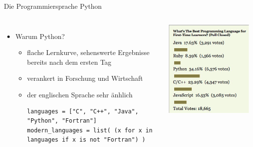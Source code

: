\begin{frame}[fragile]{Die Programmiersprache Python}
\begin{columns}
    \begin{itemize}
        \item Warum Python?
            \begin{itemize}
                \item flache Lernkurve, sehenswerte Ergebnisse bereits nach dem ersten Tag
                \item verankert in Forschung und Wirtschaft
                \item der englischen Sprache sehr änhlich
                \newline
                \newline
                \newline
                \newline
                \newline
\begin{lstlisting}[basicstyle=\tiny, frame=none]
languages = ["C", "C++", "Java", "Python", "Fortran"]
modern_languages = list( (x for x in languages if x is not "Fortran") )
\end{lstlisting}
           \end{itemize}

    \end{itemize}
    \centering\includegraphics[scale=0.5]{images/best_lang} 
\end{columns}
\end{frame}

